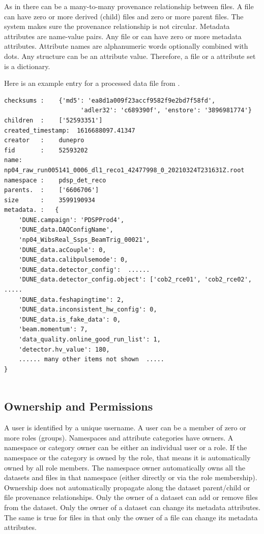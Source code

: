 \documentclass[../main-v1.tex]{subfiles}
\begin{document}
As in  there can be a many-to-many provenance relationship between files. A file can have zero or more derived (child) files and zero or more parent files. The system makes sure the provenance relationship is not circular. 
Metadata attributes are name-value pairs. Any file or  can have zero or more metadata attributes. Attribute names are alphanumeric words optionally combined with dots. Any  structure can be an attribute value. Therefore, a file or a  attribute set is a  dictionary. 


Here is an example  entry for a processed data file from . 
\begin{verbatim}
checksums :    {'md5': 'ea8d1a009f23accf9582f9e2bd7f58fd',
                     'adler32': 'c689390f', 'enstore': '3896981774'}
children  :    ['52593351']
created_timestamp:  1616688097.41347
creator   :    dunepro
fid       :    52593202
name:    np04_raw_run005141_0006_dl1_reco1_42477998_0_20210324T231631Z.root
namespace :    pdsp_det_reco
parents.  :    ['6606706']
size      :    3599190934
metadata. :   {
    'DUNE.campaign': 'PDSPProd4',
    'DUNE_data.DAQConfigName',
    'np04_WibsReal_Ssps_BeamTrig_00021',
    'DUNE_data.acCouple': 0,
    'DUNE_data.calibpulsemode': 0,
    'DUNE_data.detector_config':  ...... 
    'DUNE_data.detector_config.object': ['cob2_rce01', 'cob2_rce02', .....
    'DUNE_data.feshapingtime': 2,
    'DUNE_data.inconsistent_hw_config': 0,
    'DUNE_data.is_fake_data': 0,
    'beam.momentum': 7,
    'data_quality.online_good_run_list': 1,
    'detector.hv_value': 180,
    ...... many other items not shown  .....
}


 \end{verbatim}

\subsection{Ownership and Permissions }

A  user  is identified  by a unique username. A user can be a member of zero or more roles (groups). Namespaces and attribute categories have owners. A namespace or category owner can be either an individual user or a role. If the namespace or the category is owned by the role, %
that means it is automatically owned by all role members. 
The namespace owner automatically owns all the datasets and files in that namespace (either directly or via the role membership). Ownership does not automatically propagate along the dataset parent/child or file provenance relationships. 
Only the owner of a dataset %
can add or remove files from the dataset. Only the owner of a dataset can change its metadata attributes. The same is true for files in that only the owner of a file can change its metadata attributes. %
\end{document}
